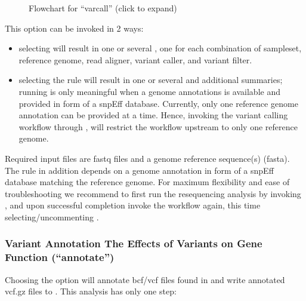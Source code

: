 \documentclass[letterpaper,10pt,english]{sphinxhowto}
\let\sphinxpxdimen\pdfpxdimen\else\newdimen\sphinxpxdimen
\begin{document}
\begin{figure}[htbp]
\centering
\capstart

\noindent\sphinxincludegraphics[height=800\sphinxpxdimen]{{dna-proto-workflow-varcall-11}.png}
\caption{Flowchart for “varcall” (click to expand)}\label{\detokenize{index:id10}}\end{figure}

This option can be invoked in 2 ways:
\begin{itemize}
\item {} 
selecting  will result in one or several , one for each combination of sample\sphinxhyphen{}set, reference genome, read aligner, variant caller, and variant filter.

\item {} 
selecting the rule  will result in one or several  and additional summaries; running   is only meaningful when a genome annotations is available and provided in form of a snpEff database. Currently, only one reference genome annotation can be provided at a time. Hence, invoking the variant calling workflow through , will restrict the  workflow upstream to only one reference genome.

\end{itemize}

Required input files are fastq files and a genome reference sequence(s) (fasta). The rule  in addition depends on a genome annotation in form of a snpEff database matching the reference genome. For maximum flexibility and ease of troubleshooting we recommend to first run the re\sphinxhyphen{}sequencing analysis by invoking , and upon successful completion invoke the workflow again, this time selecting/uncommenting .


\subsubsection{Variant Annotation \sphinxhyphen{} The Effects of Variants on Gene Function (“annotate”)}
\label{\detokenize{index:variant-annotation-the-effects-of-variants-on-gene-function-annotate}}
Choosing the option  will annotate bcf/vcf files found in  and write annotated vcf.gz files to . This analysis has only one step:
\end{document}
